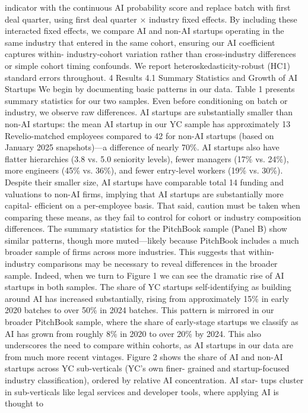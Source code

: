 indicator with the continuous AI probability score and replace batch with first deal quarter, using
first deal quarter × industry fixed effects.
By including these interacted fixed effects, we compare AI and non-AI startups operating in
the same industry that entered in the same cohort, ensuring our AI coefficient captures within-
industry-cohort variation rather than cross-industry differences or simple cohort timing confounds.
We report heteroskedasticity-robust (HC1) standard errors throughout.
4
Results
4.1
Summary Statistics and Growth of AI Startups
We begin by documenting basic patterns in our data.
Table 1 presents summary statistics for
our two samples. Even before conditioning on batch or industry, we observe raw differences. AI
startups are substantially smaller than non-AI startups: the mean AI startup in our YC sample
has approximately 13 Revelio-matched employees compared to 42 for non-AI startups (based on
January 2025 snapshots)—a difference of nearly 70\%. AI startups also have flatter hierarchies (3.8
vs. 5.0 seniority levels), fewer managers (17\% vs. 24\%), more engineers (45\% vs. 36\%), and fewer
entry-level workers (19\% vs. 30\%). Despite their smaller size, AI startups have comparable total
14
funding and valuations to non-AI firms, implying that AI startups are substantially more capital-
efficient on a per-employee basis. That said, caution must be taken when comparing these means,
as they fail to control for cohort or industry composition differences. The summary statistics for the
PitchBook sample (Panel B) show similar patterns, though more muted—likely because PitchBook
includes a much broader sample of firms across more industries. This suggests that within-industry
comparisons may be necessary to reveal differences in the broader sample.
Indeed, when we turn to Figure 1 we can see the dramatic rise of AI startups in both samples.
The share of YC startups self-identifying as building around AI has increased substantially, rising
from approximately 15\% in early 2020 batches to over 50\% in 2024 batches. This pattern is mirrored
in our broader PitchBook sample, where the share of early-stage startups we classify as AI has grown
from roughly 8\% in 2020 to over 20\% by 2024. This also underscores the need to compare within
cohorts, as AI startups in our data are from much more recent vintages.
Figure 2 shows the share of AI and non-AI startups across YC sub-verticals (YC’s own finer-
grained and startup-focused industry classification), ordered by relative AI concentration. AI star-
tups cluster in sub-verticals like legal services and developer tools, where applying AI is thought to
